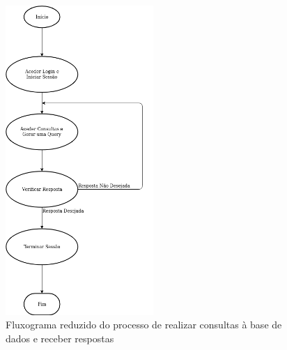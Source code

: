 \documentclass[11pt,twoside,a4paper]{report}
\begin{document}
\begin{figure}
	\begin{center}
		\hspace{3.5cm}
		\includegraphics[width=0.5\textwidth]{fluxograma_simples_consultas01} %
		\caption[Fluxograma reduzido do processo de realizar consultas à base de dados]{Fluxograma reduzido do processo de realizar consultas à base de dados e receber respostas}
		\label{fig:aplicacao_simples_consultas}
	\end{center}
\end{figure}
\end{document}
